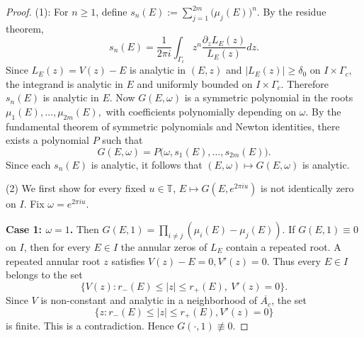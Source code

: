 \documentclass[reqno,11pt]{amsart}
\begin{document}
\begin{proof}
(1): For $n\ge 1$, define 
$s_n(E):=\sum_{j=1}^{2m}\bigl(\mu_j(E)\bigr)^n.$
By the residue theorem,
$$
s_n(E)=\frac{1}{2\pi i}\int_{\Gamma_c}z^n \frac{\partial_z L_{E}^{}(z)}{L_{E}^{}(z)} dz.
$$
Since $L_{E}^{}(z)=V(z)-E$ is analytic in $(E,z)$ and $|L_{E}^{}(z)|\ge \delta_0$ on $I\times \Gamma_c$, the integrand is analytic in $E$ and uniformly bounded on $I\times\Gamma_c$. Therefore $s_n(E)$ is analytic in $E$.
Now $G(E,\omega)$ is a symmetric polynomial in the roots
$
\mu_1(E),\dots,\mu_{2m}(E),
$
with coefficients polynomially depending on $\omega$. By the fundamental theorem of symmetric polynomials and Newton identities, there exists a polynomial $ P$ such that
$$
G(E,\omega)= P\bigl(\omega,s_1(E),\dots,s_{2m}(E)\bigr).
$$
Since each $s_n(E)$ is analytic, it follows that $(E,\omega)\mapsto G(E,\omega)$ is analytic.

(2) We first show  for every fixed $u\in\mathbb T$,
$E\longmapsto G(E,e^{2\pi i u})$
is not identically zero on $I$. Fix $\omega=e^{2\pi i u}$.

{\bf Case 1: $\omega=1$.}
Then
$
G(E,1)=\prod_{i\neq j}(\mu_i(E)-\mu_j(E)).
$
If $G(E,1)\equiv 0$ on $I$, then for every $E\in I$ the annular zeros of $L_{E}^{}$ contain a repeated root. A repeated annular root $z$ satisfies
$V(z)-E=0, V'(z)=0.$
Thus every $E\in I$ belongs to the set
$$\{V(z): r_-(E)\leq|z|\leq r_+(E),\ V'(z)=0\}.$$
Since $V$ is non-constant and analytic in a neighborhood of $\overline{A_c}$, the set
$$\{z:r_-(E)\leq|z|\leq r_+(E), V'(z)=0\}$$
is finite. This is a contradiction. Hence $G(\cdot,1)\not\equiv 0$.


\end{proof}
\end{document}
